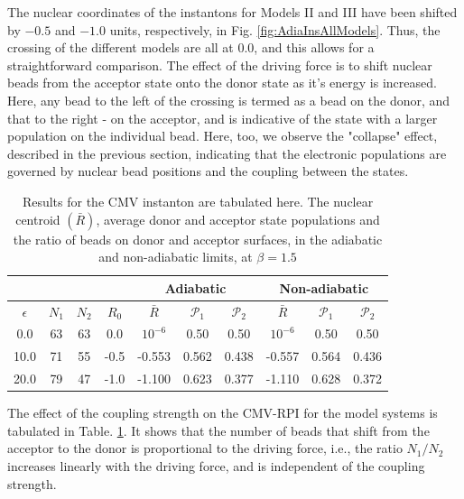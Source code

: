 \documentclass[%
 aip,
 jmp,%
 amsmath,amssymb,
reprint,%
]{revtex4-1}
\begin{document}
The nuclear coordinates of the instantons for Models II and III have been shifted by $-0.5$ and $-1.0$ units, respectively, in Fig. \ref{fig:AdiaInsAllModels}. Thus, the crossing of the different models are all at $0.0$, and this allows for a straightforward comparison. The effect of the driving force is to shift nuclear beads from the acceptor state onto the donor state as it's energy is increased. Here, any bead to the left of the crossing is termed as a bead on the donor, and that to the right - on the acceptor, and is indicative of the state with a larger population on the individual bead. Here, too, we observe the "collapse" effect, described in the previous section, indicating that the electronic populations are governed by nuclear bead positions and the coupling between the states. 
\begin{table}[ht!]
\renewcommand{\arraystretch}{1.5}
\centering
\begin{tabular}{|c|c|c|c|c|c|c|c|c|c|} \hline
\multicolumn{4}{|c|}{} & \multicolumn{3}{c|}{Adiabatic}     & \multicolumn{3}{c|}{Non-adiabatic}  \\ \hline
$\epsilon$ & $N_{1}$ & $N_{2}$& $R_{0}$ & $\bar{R}$ & $\mathcal{P}_{1}$ & $\mathcal{P}_{2}$ & $\bar{R}$ & $\mathcal{P}_{1}$ & $\mathcal{P}_{2}$ \\ \hline
0.0 & 63 & 63 & 0.0 & $ 10^{-6}$ & 0.50  & 0.50 & $ 10^{-6}$ & 0.50  & 0.50    \\ \hline
10.0 & 71 & 55 & -0.5 & -0.553  & 0.562 & 0.438 & -0.557  & 0.564  &  0.436 \\ \hline
20.0 & 79 & 47 &  -1.0 &  -1.100 & 0.623 & 0.377 &  -1.110  &  0.628   & 0.372  \\ \hline
\end{tabular}
\caption{Results for the CMV instanton are tabulated here. The nuclear centroid $(\bar{R})$, average donor and acceptor state populations and the ratio of beads on donor and acceptor surfaces, in the adiabatic and non-adiabatic limits, at $\beta=1.5$} \label{table:CMV}
\renewcommand{\arraystretch}{1.0}
\end{table}
The effect of the coupling strength on the CMV-RPI for the model systems is tabulated in Table. \ref{table:CMV}. It shows that the number of beads that shift from the acceptor to the donor is proportional to the driving force, i.e., the ratio $N_{1}/N_{2}$ increases linearly with the driving force, and is independent of the coupling strength. 
\end{document}
